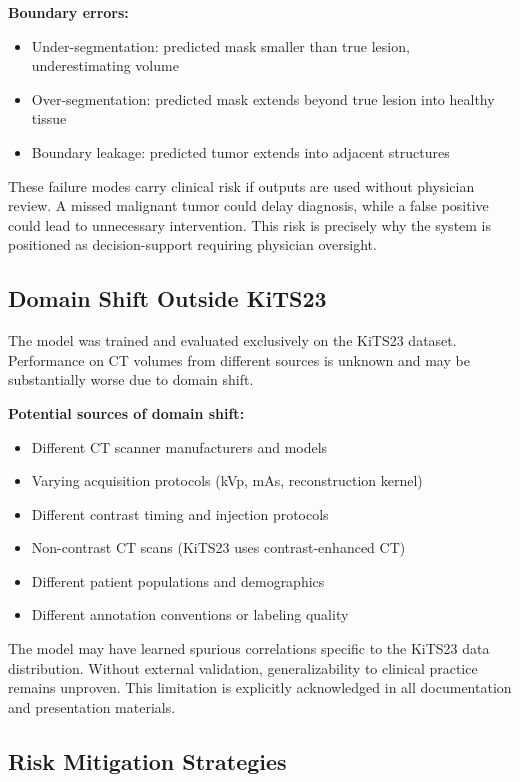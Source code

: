 \textbf{Boundary errors:}
\begin{itemize}
    \item Under-segmentation: predicted mask smaller than true lesion, underestimating volume
    \item Over-segmentation: predicted mask extends beyond true lesion into healthy tissue
    \item Boundary leakage: predicted tumor extends into adjacent structures
\end{itemize}

These failure modes carry clinical risk if outputs are used without physician review. A missed malignant tumor could delay diagnosis, while a false positive could lead to unnecessary intervention. This risk is precisely why the system is positioned as decision-support requiring physician oversight.

\subsection{Domain Shift Outside KiTS23}

The model was trained and evaluated exclusively on the KiTS23 dataset. Performance on CT volumes from different sources is unknown and may be substantially worse due to domain shift.

\textbf{Potential sources of domain shift:}
\begin{itemize}
    \item Different CT scanner manufacturers and models
    \item Varying acquisition protocols (kVp, mAs, reconstruction kernel)
    \item Different contrast timing and injection protocols
    \item Non-contrast CT scans (KiTS23 uses contrast-enhanced CT)
    \item Different patient populations and demographics
    \item Different annotation conventions or labeling quality
\end{itemize}

The model may have learned spurious correlations specific to the KiTS23 data distribution. Without external validation, generalizability to clinical practice remains unproven. This limitation is explicitly acknowledged in all documentation and presentation materials.

\subsection{Risk Mitigation Strategies}

